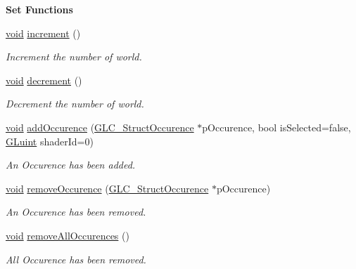 \begin{Indent}{\bf Set Functions}\par
\begin{DoxyCompactItemize}
\item 
\hyperlink{group___u_a_v_objects_plugin_ga444cf2ff3f0ecbe028adce838d373f5c}{void} \hyperlink{class_g_l_c___world_handle_a85588e138963ba90a0a5d7f1dbb72e77}{increment} ()
\begin{DoxyCompactList}\small\item\em Increment the number of world. \end{DoxyCompactList}\item 
\hyperlink{group___u_a_v_objects_plugin_ga444cf2ff3f0ecbe028adce838d373f5c}{void} \hyperlink{class_g_l_c___world_handle_aaf705d4865eb2d6909073db6c0c3397d}{decrement} ()
\begin{DoxyCompactList}\small\item\em Decrement the number of world. \end{DoxyCompactList}\item 
\hyperlink{group___u_a_v_objects_plugin_ga444cf2ff3f0ecbe028adce838d373f5c}{void} \hyperlink{class_g_l_c___world_handle_ae363552e639328225c417db4f5dcf790}{add\-Occurence} (\hyperlink{class_g_l_c___struct_occurence}{G\-L\-C\-\_\-\-Struct\-Occurence} $\ast$p\-Occurence, bool is\-Selected=false, \hyperlink{glext_8h_a2f0c8cd5c21f9fcbd931c3f48bc90dfc}{G\-Luint} shader\-Id=0)
\begin{DoxyCompactList}\small\item\em An Occurence has been added. \end{DoxyCompactList}\item 
\hyperlink{group___u_a_v_objects_plugin_ga444cf2ff3f0ecbe028adce838d373f5c}{void} \hyperlink{class_g_l_c___world_handle_a0babef6776eb21545aff6797102a01ad}{remove\-Occurence} (\hyperlink{class_g_l_c___struct_occurence}{G\-L\-C\-\_\-\-Struct\-Occurence} $\ast$p\-Occurence)
\begin{DoxyCompactList}\small\item\em An Occurence has been removed. \end{DoxyCompactList}\item 
\hyperlink{group___u_a_v_objects_plugin_ga444cf2ff3f0ecbe028adce838d373f5c}{void} \hyperlink{class_g_l_c___world_handle_a1121f6a6a02f79997e8bcfbebfca6b7f}{remove\-All\-Occurences} ()
\begin{DoxyCompactList}\small\item\em All Occurence has been removed. \end{DoxyCompactList}\item 

\end{DoxyCompactItemize}
\end{Indent}
